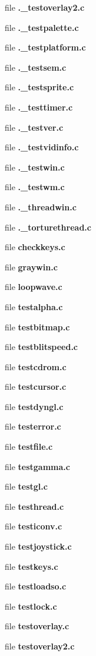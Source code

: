 \begin{DoxyCompactItemize}
file {\bfseries .\+\_\+testoverlay2.\+c}
\item 
file {\bfseries .\+\_\+testpalette.\+c}
\item 
file {\bfseries .\+\_\+testplatform.\+c}
\item 
file {\bfseries .\+\_\+testsem.\+c}
\item 
file {\bfseries .\+\_\+testsprite.\+c}
\item 
file {\bfseries .\+\_\+testtimer.\+c}
\item 
file {\bfseries .\+\_\+testver.\+c}
\item 
file {\bfseries .\+\_\+testvidinfo.\+c}
\item 
file {\bfseries .\+\_\+testwin.\+c}
\item 
file {\bfseries .\+\_\+testwm.\+c}
\item 
file {\bfseries .\+\_\+threadwin.\+c}
\item 
file {\bfseries .\+\_\+torturethread.\+c}
\item 
file {\bfseries checkkeys.\+c}
\item 
file {\bfseries graywin.\+c}
\item 
file {\bfseries loopwave.\+c}
\item 
file {\bfseries testalpha.\+c}
\item 
file {\bfseries testbitmap.\+c}
\item 
file {\bfseries testblitspeed.\+c}
\item 
file {\bfseries testcdrom.\+c}
\item 
file {\bfseries testcursor.\+c}
\item 
file {\bfseries testdyngl.\+c}
\item 
file {\bfseries testerror.\+c}
\item 
file {\bfseries testfile.\+c}
\item 
file {\bfseries testgamma.\+c}
\item 
file {\bfseries testgl.\+c}
\item 
file {\bfseries testhread.\+c}
\item 
file {\bfseries testiconv.\+c}
\item 
file {\bfseries testjoystick.\+c}
\item 
file {\bfseries testkeys.\+c}
\item 
file {\bfseries testloadso.\+c}
\item 
file {\bfseries testlock.\+c}
\item 
file {\bfseries testoverlay.\+c}
\item 
file {\bfseries testoverlay2.\+c}

\end{DoxyCompactItemize}
